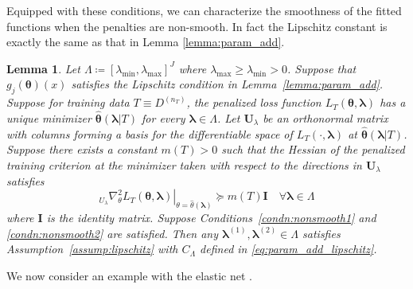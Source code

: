 \documentclass[12pt]{article} %
\newtheorem{lemma}{Lemma}
\theoremstyle{definition}
\begin{document}
Equipped with these conditions, we can characterize the smoothness of the fitted functions when the penalties are non-smooth. In fact the Lipschitz constant is exactly the same as that in Lemma \ref{lemma:param_add}.

\begin{lemma}
	\label{lemma:nonsmooth}
	Let $\Lambda \coloneqq \left [ \lambda_{\min}, \lambda_{\max} \right ]^J$ where $\lambda_{\max} \ge \lambda_{\min} > 0$.
	Suppose that $g_j(\boldsymbol{\theta})(x)$ satisfies the Lipschitz condition in Lemma~\ref{lemma:param_add}.
	Suppose for training data $T\equiv D^{(n_{T})}$, the penalized loss function $L_{T}\left(\boldsymbol{\theta},\boldsymbol{\lambda}\right)$
	has a unique minimizer $\hat{\boldsymbol{\theta}}(\boldsymbol{\lambda}|T)$
	for every $\boldsymbol{\lambda}\in\Lambda$.
	Let $\boldsymbol{U}_{\lambda}$
	be an orthonormal matrix with columns forming a basis for the differentiable
	space of $L_{T}(\cdot,\boldsymbol{\lambda})$ at $\hat{\boldsymbol{\theta}}(\boldsymbol{\lambda}|T)$.
	Suppose there exists a constant $m(T)>0$ such that the Hessian of
	the penalized training criterion at the minimizer taken with respect
	to the directions in $\boldsymbol{U}_{\lambda}$ satisfies 
	\begin{equation}
	\left._{U_{\lambda}}\nabla_{\theta}^{2}L_{T}(\boldsymbol{\theta},\boldsymbol{\lambda})\right|_{\theta=\hat{\theta}(\boldsymbol{\lambda})}\succeq m(T)\boldsymbol{I}\quad\forall\boldsymbol{\lambda}\in\Lambda
	\end{equation}
	where \textup{$\boldsymbol{I}$ is the identity matrix.}
	Suppose Conditions~\ref{condn:nonsmooth1} and \ref{condn:nonsmooth2} are satisfied.
	Then any $\boldsymbol{\lambda}^{(1)}, \boldsymbol{\lambda}^{(2)} \in \Lambda$ satisfies Assumption~\ref{assump:lipschitz} with $C_\Lambda$ defined in \eqref{eq:param_add_lipschitz}.
\end{lemma}

We now consider an example with the elastic net \citep{zou2003regression}.
\end{document}
